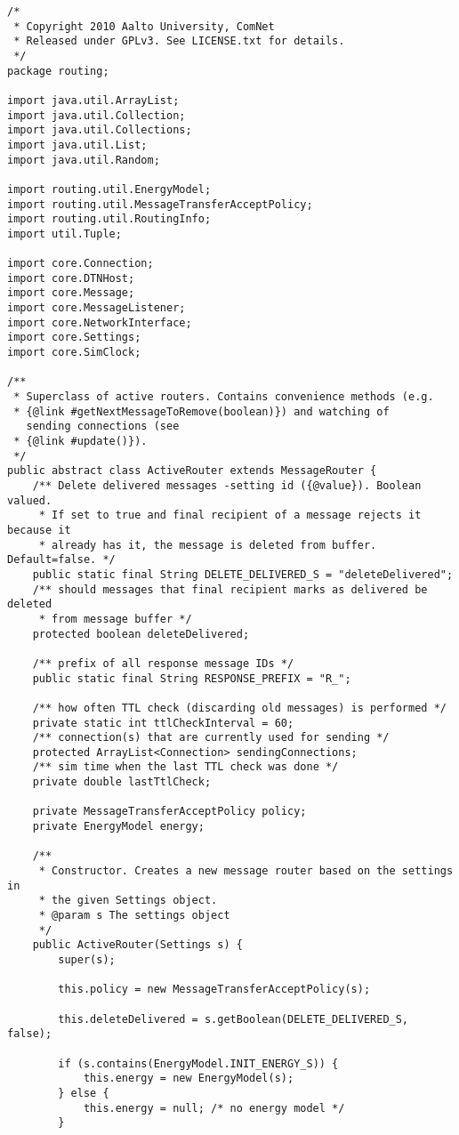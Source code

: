 \documentclass[11pt]{icsthesis}
\begin{document}
\begin{framed}
\begin{verbatim}
/* 
 * Copyright 2010 Aalto University, ComNet
 * Released under GPLv3. See LICENSE.txt for details. 
 */
package routing;

import java.util.ArrayList;
import java.util.Collection;
import java.util.Collections;
import java.util.List;
import java.util.Random;

import routing.util.EnergyModel;
import routing.util.MessageTransferAcceptPolicy;
import routing.util.RoutingInfo;
import util.Tuple;

import core.Connection;
import core.DTNHost;
import core.Message;
import core.MessageListener;
import core.NetworkInterface;
import core.Settings;
import core.SimClock;

/**
 * Superclass of active routers. Contains convenience methods (e.g. 
 * {@link #getNextMessageToRemove(boolean)}) and watching of 
   sending connections (see
 * {@link #update()}).
 */
public abstract class ActiveRouter extends MessageRouter {
	/** Delete delivered messages -setting id ({@value}). Boolean valued.
	 * If set to true and final recipient of a message rejects it because it
	 * already has it, the message is deleted from buffer. Default=false. */
	public static final String DELETE_DELIVERED_S = "deleteDelivered";
	/** should messages that final recipient marks as delivered be deleted
	 * from message buffer */
	protected boolean deleteDelivered;
		
	/** prefix of all response message IDs */
	public static final String RESPONSE_PREFIX = "R_";
	
	/** how often TTL check (discarding old messages) is performed */
	private static int ttlCheckInterval = 60;
	/** connection(s) that are currently used for sending */
	protected ArrayList<Connection> sendingConnections;
	/** sim time when the last TTL check was done */
	private double lastTtlCheck;
	
	private MessageTransferAcceptPolicy policy;
	private EnergyModel energy;

	/**
	 * Constructor. Creates a new message router based on the settings in
	 * the given Settings object.
	 * @param s The settings object
	 */
	public ActiveRouter(Settings s) {
		super(s);
		
		this.policy = new MessageTransferAcceptPolicy(s);
		
		this.deleteDelivered = s.getBoolean(DELETE_DELIVERED_S, false);
		
		if (s.contains(EnergyModel.INIT_ENERGY_S)) {
			this.energy = new EnergyModel(s);
		} else {
			this.energy = null; /* no energy model */
		}
		

\end{verbatim}
\end{framed}
\end{document}
